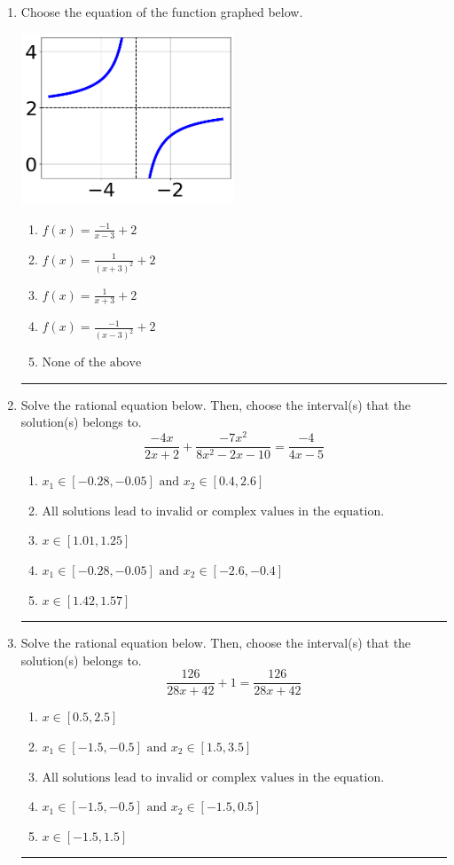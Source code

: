 \documentclass[14pt]{extbook}
\newcommand{\litem}[1]{\item#1\hspace*{-1cm}\rule{\textwidth}{0.4pt}}
\begin{document}
\begin{enumerate}
{\begin{enumerate}[label=\Alph*.]
\end{enumerate} }
\litem{
Choose the equation of the function graphed below.
\begin{center}
    \includegraphics[width=0.5\textwidth]{../Figures/rationalGraphToEquationC.png}
\end{center}
\begin{enumerate}[label=\Alph*.]
\item \( f(x) = \frac{-1}{x - 3} + 2 \)
\item \( f(x) = \frac{1}{(x + 3)^2} + 2 \)
\item \( f(x) = \frac{1}{x + 3} + 2 \)
\item \( f(x) = \frac{-1}{(x - 3)^2} + 2 \)
\item \( \text{None of the above} \)

\end{enumerate} }
\litem{
Solve the rational equation below. Then, choose the interval(s) that the solution(s) belongs to.\[ \frac{-4x}{2x + 2} + \frac{-7x^{2}}{8x^{2} -2 x -10} = \frac{-4}{4x -5} \]\begin{enumerate}[label=\Alph*.]
\item \( x_1 \in [-0.28, -0.05] \text{ and } x_2 \in [0.4,2.6] \)
\item \( \text{All solutions lead to invalid or complex values in the equation.} \)
\item \( x \in [1.01,1.25] \)
\item \( x_1 \in [-0.28, -0.05] \text{ and } x_2 \in [-2.6,-0.4] \)
\item \( x \in [1.42,1.57] \)

\end{enumerate} }
\litem{
Solve the rational equation below. Then, choose the interval(s) that the solution(s) belongs to.\[ \frac{126}{28x + 42} + 1 = \frac{126}{28x + 42} \]\begin{enumerate}[label=\Alph*.]
\item \( x \in [0.5,2.5] \)
\item \( x_1 \in [-1.5, -0.5] \text{ and } x_2 \in [1.5,3.5] \)
\item \( \text{All solutions lead to invalid or complex values in the equation.} \)
\item \( x_1 \in [-1.5, -0.5] \text{ and } x_2 \in [-1.5,0.5] \)
\item \( x \in [-1.5,1.5] \)


\end{enumerate}}
\end{enumerate}
\end{document}
